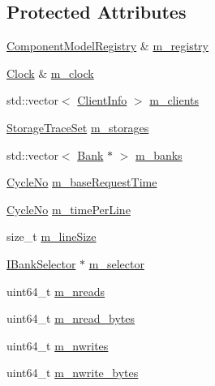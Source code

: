 \subsection*{Protected Attributes}
\begin{DoxyCompactItemize}
\item 
\hyperlink{class_component_model_registry}{Component\+Model\+Registry} \& \hyperlink{class_simulator_1_1_banked_memory_a5db228870f5f9d6023cc7d6b06af31b9}{m\+\_\+registry}
\item 
\hyperlink{class_simulator_1_1_clock}{Clock} \& \hyperlink{class_simulator_1_1_banked_memory_af6ef3e3fc49d479b727b883185ab303a}{m\+\_\+clock}
\item 
std\+::vector$<$ \hyperlink{struct_simulator_1_1_banked_memory_1_1_client_info}{Client\+Info} $>$ \hyperlink{class_simulator_1_1_banked_memory_a6a910047ff99466efe5dee7b7ec80543}{m\+\_\+clients}
\item 
\hyperlink{class_simulator_1_1_storage_trace_set}{Storage\+Trace\+Set} \hyperlink{class_simulator_1_1_banked_memory_a362c6639b1570b91f696ac5da28c735a}{m\+\_\+storages}
\item 
std\+::vector$<$ \hyperlink{class_simulator_1_1_banked_memory_1_1_bank}{Bank} $\ast$ $>$ \hyperlink{class_simulator_1_1_banked_memory_af0b36c6af11111fc50cbd4316d241b11}{m\+\_\+banks}
\item 
\hyperlink{namespace_simulator_a928f1e2101eba21bb0fe409e8c9ce573}{Cycle\+No} \hyperlink{class_simulator_1_1_banked_memory_aa9790fb4f615ddcf46b83df4a32036c8}{m\+\_\+base\+Request\+Time}
\item 
\hyperlink{namespace_simulator_a928f1e2101eba21bb0fe409e8c9ce573}{Cycle\+No} \hyperlink{class_simulator_1_1_banked_memory_a23e5b01a0d29de297c3137e51c1349c6}{m\+\_\+time\+Per\+Line}
\item 
size\+\_\+t \hyperlink{class_simulator_1_1_banked_memory_aa8f9ecc5e0ee2035c884b95795f5e0a4}{m\+\_\+line\+Size}
\item 
\hyperlink{class_simulator_1_1_i_bank_selector}{I\+Bank\+Selector} $\ast$ \hyperlink{class_simulator_1_1_banked_memory_a4f9e131866f9b27a8b1c628fb3f98427}{m\+\_\+selector}
\item 
uint64\+\_\+t \hyperlink{class_simulator_1_1_banked_memory_a1c2168b2983e4b756a473d1953b8b6a3}{m\+\_\+nreads}
\item 
uint64\+\_\+t \hyperlink{class_simulator_1_1_banked_memory_a92a71a7aaee6d7d0e6dedba3b3264064}{m\+\_\+nread\+\_\+bytes}
\item 
uint64\+\_\+t \hyperlink{class_simulator_1_1_banked_memory_a55d4955b89dc77c553462c9edd8c9d55}{m\+\_\+nwrites}
\item 
uint64\+\_\+t \hyperlink{class_simulator_1_1_banked_memory_aa930c2c5581bc9f8823b940574124c9a}{m\+\_\+nwrite\+\_\+bytes}
\end{DoxyCompactItemize}
